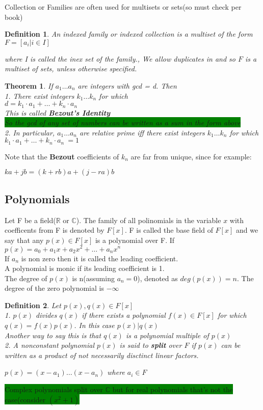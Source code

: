 \documentclass[12pt]{article}
\newcommand{\mybox}[2][black]{\colorbox{#1}{#2}}
\newcommand{\RR}{\mathbb{R}}
\newcommand{\CC}{\mathbb{C}}
\newtheorem{theorem}{Theorem}
\newtheorem{definition}{Definition}
\begin{document}
Collection or Families are often used for multisets or sets(so must check per book)

\begin{definition}
An indexed family or indexed collection is a multiset of the form 
\(F = [a_i | i \in I]\)

where I is called the inex set of the family., We allow duplicates in and so $F$ is a multiset of sets, unless otherwise specified.
\end{definition}

\begin{theorem}
If \(a_1 \ldots a_n\) are integers with gcd = d. Then\\
1. There exist integers \(k_1 \ldots k_n\) for which \\
\(d =k_1 \cdot a_1 + \ldots + k_n \cdot a_n\)\\
This is called \textbf{Bezout's Identity}\\
\mybox[green]{So the gcd of any set of numbers can be written as a sum in the form above}\\
2. In particular, \(a_1 \ldots a_n\) are relative prime iff there exist integers \(k_1 \ldots k_n\) for which 
\(k_1\cdot a_1 + \ldots + k_n \cdot a_n \ = 1\) \\
\end{theorem}
Note that the \textbf{Bezout} coefficients of $k_n$ are far from unique, since for example:

\(ka + jb = (k + rb)a + (j - ra)b\)

\subsection{Polynomials}

Let F be a field($\RR$ or $\CC$). The family of all polinomials in the variable $x$ with coefficents from F is denoted by $F[x]$. F is called the base field of $F[x]$ and we say that any $p(x) \in F[x]$ is a polynomial over F. If \(p(x) = a_0 + a_{1} x + a_{2} x^{2} + \ldots + a_{n} x^{n}\) \\
\indent If $a_n$ is non zero then it is called the leading coefficient.\\
\indent A polynomial is monic if its leading coefficient is 1. \\
\indent The degree of $p(x)$ is n(assuming $a_n = 0$), denoted as $deg(p(x))=n$. The degree of the zero polynomial is $-\infty$


\begin{definition}
Let $p(x), q(x) \in F[x]$\\
1. $p(x)$ divides $q(x)$ if there exists a polynomial $f(x) \in F[x]$ for which $q(x) = f(x)p(x)$. In this case $p(x)|q(x)$\\ 
Another way to say this is that $q(x)$ is a polynomial multiple of $p(x)$\\
2. A nonconstant polynomial $p(x)$ is said to \textbf{split} over $F$ if $p(x)$ can be written as a product of not necessarily disctinct linear factors.

\(p(x) = (x-a_1) \ldots (x - a_n)\) where $a_i \in F$
\end{definition}
\mybox[green]{Complex polynomials split over $\CC$ but for real polynomials that's not the case(consider $(x^2 + 1)$} 
\end{document}
